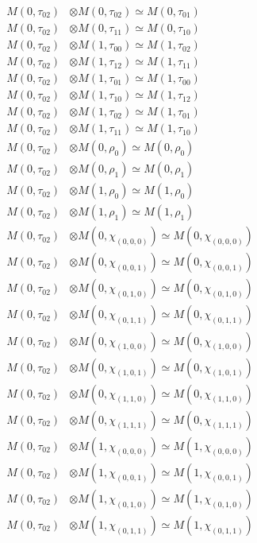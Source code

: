 \begin{align*}
M(0,\tau_{02}) &\otimes M(0,\tau_{02}) \simeq M(0,\tau_{01}) \\
M(0,\tau_{02}) &\otimes M(0,\tau_{11}) \simeq M(0,\tau_{10}) \\
M(0,\tau_{02}) &\otimes M(1,\tau_{00}) \simeq M(1,\tau_{02}) \\
M(0,\tau_{02}) &\otimes M(1,\tau_{12}) \simeq M(1,\tau_{11}) \\
M(0,\tau_{02}) &\otimes M(1,\tau_{01}) \simeq M(1,\tau_{00}) \\
M(0,\tau_{02}) &\otimes M(1,\tau_{10}) \simeq M(1,\tau_{12}) \\
M(0,\tau_{02}) &\otimes M(1,\tau_{02}) \simeq M(1,\tau_{01}) \\
M(0,\tau_{02}) &\otimes M(1,\tau_{11}) \simeq M(1,\tau_{10}) \\
M(0,\tau_{02}) &\otimes M(0,\rho_{0}) \simeq M(0,\rho_{0}) \\
M(0,\tau_{02}) &\otimes M(0,\rho_{1}) \simeq M(0,\rho_{1}) \\
M(0,\tau_{02}) &\otimes M(1,\rho_{0}) \simeq M(1,\rho_{0}) \\
M(0,\tau_{02}) &\otimes M(1,\rho_{1}) \simeq M(1,\rho_{1}) \\
M(0,\tau_{02}) &\otimes M(0,\chi_{(0,0,0)}) \simeq M(0,\chi_{(0,0,0)}) \\
M(0,\tau_{02}) &\otimes M(0,\chi_{(0,0,1)}) \simeq M(0,\chi_{(0,0,1)}) \\
M(0,\tau_{02}) &\otimes M(0,\chi_{(0,1,0)}) \simeq M(0,\chi_{(0,1,0)}) \\
M(0,\tau_{02}) &\otimes M(0,\chi_{(0,1,1)}) \simeq M(0,\chi_{(0,1,1)}) \\
M(0,\tau_{02}) &\otimes M(0,\chi_{(1,0,0)}) \simeq M(0,\chi_{(1,0,0)}) \\
M(0,\tau_{02}) &\otimes M(0,\chi_{(1,0,1)}) \simeq M(0,\chi_{(1,0,1)}) \\
M(0,\tau_{02}) &\otimes M(0,\chi_{(1,1,0)}) \simeq M(0,\chi_{(1,1,0)}) \\
M(0,\tau_{02}) &\otimes M(0,\chi_{(1,1,1)}) \simeq M(0,\chi_{(1,1,1)}) \\
M(0,\tau_{02}) &\otimes M(1,\chi_{(0,0,0)}) \simeq M(1,\chi_{(0,0,0)}) \\
M(0,\tau_{02}) &\otimes M(1,\chi_{(0,0,1)}) \simeq M(1,\chi_{(0,0,1)}) \\
M(0,\tau_{02}) &\otimes M(1,\chi_{(0,1,0)}) \simeq M(1,\chi_{(0,1,0)}) \\
M(0,\tau_{02}) &\otimes M(1,\chi_{(0,1,1)}) \simeq M(1,\chi_{(0,1,1)}) \\

\end{align*}
